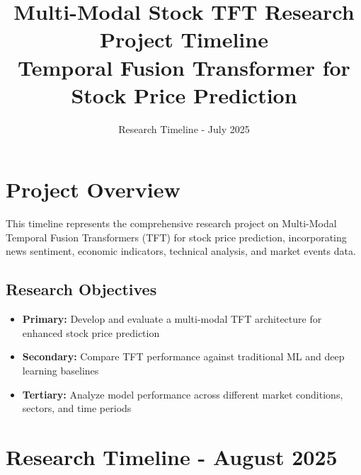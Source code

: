 \documentclass[11pt]{article}
\title{Multi-Modal Stock TFT Research Project Timeline \\ 
       \large{Temporal Fusion Transformer for Stock Price Prediction}}
\author{Research Timeline - July 2025}
\date{}
\begin{document}
\maketitle

\section{Project Overview}

This timeline represents the comprehensive research project on Multi-Modal Temporal Fusion Transformers (TFT) for stock price prediction, incorporating news sentiment, economic indicators, technical analysis, and market events data.

\subsection{Research Objectives}
\begin{itemize}[leftmargin=*]
    \item \textbf{Primary:} Develop and evaluate a multi-modal TFT architecture for enhanced stock price prediction
    \item \textbf{Secondary:} Compare TFT performance against traditional ML and deep learning baselines
    \item \textbf{Tertiary:} Analyze model performance across different market conditions, sectors, and time periods
\end{itemize}

\section{Research Timeline - August 2025}
\end{document}
